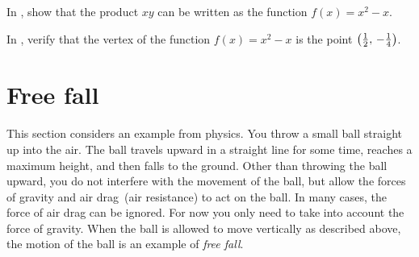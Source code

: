 \documentclass[a4paper,oneside,12pt]{article}
\begin{document}

\begin{exercise}
In , show that the product $xy$ can be
written as the function $f(x) = x^2 - x$.
\end{exercise}


\begin{exercise}
In , verify that the vertex of the
function $f(x) = x^2 - x$ is the point
$\left\lparen{\frac{1}{2}},\, {-\frac{1}{4}}\right\rparen$.
\end{exercise}




\section{Free fall}

This section considers an example from physics.  You throw a small
ball straight up into the air.  The ball travels upward in a straight
line for some time, reaches a maximum height, and then falls to the
ground.  Other than throwing the ball upward, you do not interfere
with the movement of the ball, but allow the forces of gravity and air
drag~(air resistance) to act on the ball.  In many cases, the force of
air drag can be ignored.  For now you only need to take into account
the force of gravity.  When the ball is allowed to move vertically as
described above, the motion of the ball is an example of
\emph{free fall}.
\end{document}
